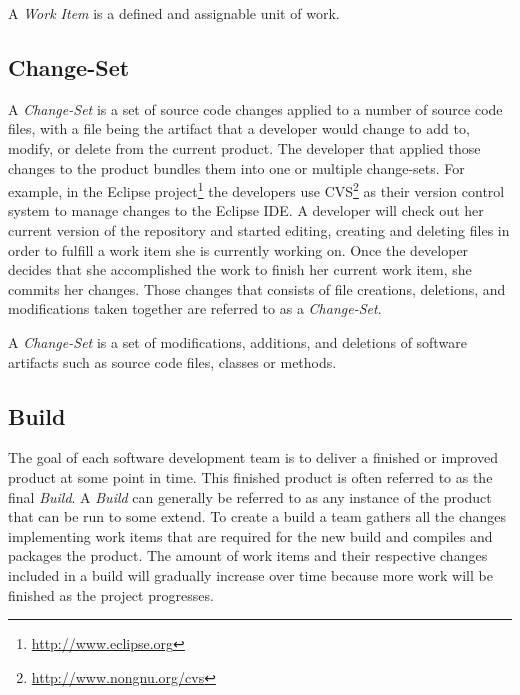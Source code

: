 \begin{note}
\begin{mydef}
A \emph{Work Item} is a defined and assignable unit of work.
\end{mydef}
\end{note} 

\subsection{Change-Set}
A \emph{Change-Set} is a set of source code changes applied to a number of source code files, with a file being the artifact that a developer would change to add to, modify, or delete from the current product. 
The developer that applied those changes to the product bundles them into one or multiple change-sets.
For example, in the Eclipse project\footnote{\url{http://www.eclipse.org}} the developers use CVS\footnote{\url{http://www.nongnu.org/cvs}} as their version control system to manage changes to the Eclipse IDE.
A developer will check out her current version of the repository and started editing, creating and deleting files in order to fulfill a work item she is currently working on.
Once the developer decides that she accomplished the work to finish her current work item, she commits her changes.
Those changes that consists of file creations, deletions, and modifications taken together are referred to as a \emph{Change-Set}. 

\begin{note}
\begin{mydef}
A \emph{Change-Set} is a set of modifications, additions, and deletions of software artifacts such as source code files, classes or methods.
\end{mydef}
\end{note}

\subsection{Build}
The goal of each software development team is to deliver a finished or improved product at some point in time.
This finished product is often referred to as the final \emph{Build}.
A \emph{Build} can generally be referred to as any instance of the product that can be run to some extend.
To create a build a team gathers all the changes implementing work items that are required for the new build and compiles and packages the product.
The amount of work items and their respective changes included in a build will gradually increase over time because more work will be finished as the project progresses.

